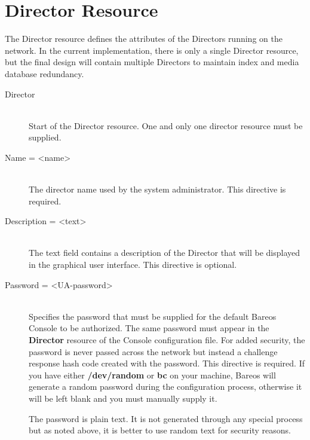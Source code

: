\section{Director Resource}
\label{DirectorResource4}

The Director resource defines the attributes of the Directors running on the
network. In the current implementation, there is only a single Director
resource, but the final design will contain multiple Directors to maintain
index and media database redundancy.

\begin{description}

\item [Director] \hfill \\
Start of the Director resource. One and only one  director resource must be
supplied.

\item [Name = {\textless}name{\textgreater}] \hfill \\
The director name used by the system  administrator. This directive is
required.

\item [Description = {\textless}text{\textgreater}] \hfill \\
The text field contains a  description of the Director that will be displayed
in the  graphical user interface. This directive is optional.

\item [Password = {\textless}UA-password{\textgreater}] \hfill \\
Specifies the password that must be supplied for the default Bareos
Console to be authorized.  The same password must appear in the {\bf
Director} resource of the Console configuration file.  For added
security, the password is never passed across the network but instead a
challenge response hash code created with the password.  This directive
is required.  If you have either {\bf /dev/random} or {\bf bc} on your
machine, Bareos will generate a random password during the configuration
process, otherwise it will be left blank and you must manually supply
it.

The password is plain text.  It is not generated through any special
process but as noted above, it is better to use random text for
security reasons.


\end{description}

